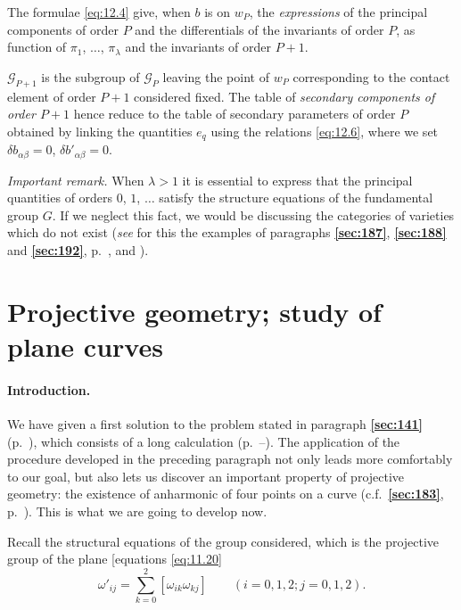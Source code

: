 \documentclass[leqno,11pt]{book}
\numberwithin{equation}{chapter}
\theoremstyle{shape1}
\theoremstyle{shapesmall}
\newcommand{\fsref}[1]{{\rm\textsection\textbf{\ref{sec:#1}}}}
\newcommand{\somespace}{\vspace{9pt}}
\begin{document}
\somespace

The formulae \eqref{eq:12.4} give, when $b$ is on $w_{P}$, the \emph{expressions} of the principal components of order $P$ and the differentials of the invariants of order $P$, as function of $\pi_{1}$, $\dots$, $\pi_{\lambda}$ and the invariants of order $P+1$.

$\mathcal{G}_{P+1}$ is the subgroup of $\mathcal{G}_{P}$ leaving the point of $w_{P}$ corresponding to the contact element of order $P+1$ considered fixed. The table of \emph{secondary components of order $P+1$} hence reduce to the table of secondary parameters of order $P$ obtained by linking the quantities $e_{q}$ using the relations \eqref{eq:12.6}, where we set $\delta b_{\alpha\beta}=0$, $\delta b'_{\alpha\beta}=0$.

\somespace

\emph{Important remark.} When $\lambda>1$ it is essential to express that the principal quantities of orders $0$, $1$, $\dots$ satisfy the structure equations of the fundamental group $G$. If we neglect this fact, we would be discussing the categories of varieties which do not exist (\emph{see} for this the examples of paragraphs \fsref{187}, \fsref{188} and \fsref{192}, p.~\pageref{sec:187}, \pageref{sec:188} and \pageref{sec:192}).


\section{Projective geometry; study of plane curves}
\label{sec:proj-geom-study-1}

\paragraph{Introduction.}
\label{sec:173}

We have given a first solution to the problem stated in paragraph \fsref{141} (p.~\pageref{sec:141}), which consists of a long calculation (p.~\pageref{sec:142}--\pageref{sec:149}). The application of the procedure developed in the preceding paragraph not only leads more comfortably to our goal, but also lets us discover an important property of projective geometry: the existence of anharmonic of four points on a curve (c.f.~\fsref{183}, p.~\pageref{sec:183}). This is what we are going to develop now.

Recall the structural equations of the group considered, which is the projective group of the plane [equations \eqref{eq:11.20}
\begin{equation}
  \label{eq:12.7}
  \omega'_{ij}=\sum_{k=0}^{2}[\omega_{ik}\omega_{kj}]\qquad(i=0,1,2;j=0,1,2).
\end{equation}
\end{document}
